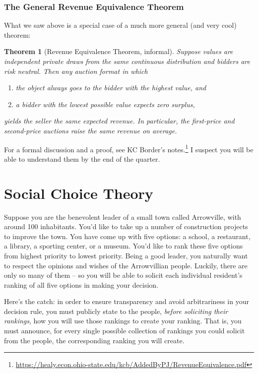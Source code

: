 \documentclass[12pt]{article}
\newtheorem{theorem}{Theorem}
\theoremstyle{definition}
\theoremstyle{remark}
\theoremstyle{plain}                          %
\begin{document}
\subsubsection{The General Revenue Equivalence Theorem}

What we saw above is a special case of a much more general (and very cool) theorem:

\begin{theorem}[Revenue Equivalence Theorem, informal]\label{thm:ret}
Suppose values are independent private draws from the same continuous
distribution and bidders are risk neutral. Then \emph{any} auction format in
which
\begin{enumerate}[label=(\roman*), nosep, topsep=3pt]
  \item the object always goes to the bidder with the highest value, and
  \item a bidder with the lowest possible value expects zero surplus,
\end{enumerate}
yields the seller the same expected revenue. In particular, the first-price and
second-price auctions raise the same revenue on average.
\end{theorem}

For a formal discussion and a proof, see KC Border's notes.\footnote{\url{https://healy.econ.ohio-state.edu/kcb/AddedByPJ/RevenueEquivalence.pdf}} I suspect you will be able to understand them by the end of the quarter.

\newpage

\section{Social Choice Theory}
 
Suppose you are the benevolent leader of a small town called Arrowville, with around 100 inhabitants. You'd like to take up a number of construction projects to improve the town. You have come up with five options: a school, a restaurant, a library, a sporting center, or a museum. You'd like to rank these five options from highest priority to lowest priority. Being a good leader, you naturally want to respect the opinions and wishes of the Arrowvillian people. Luckily, there are only so many of them -- so you will be able to solicit each individual resident's ranking of all five options in making your decision.
 
Here's the catch: in order to ensure transparency and avoid arbitrariness in your decision rule, you must publicly state to the people, \textit{before soliciting their rankings}, how you will use those rankings to create your ranking. That is, you must announce, for every single possible collection of rankings you could solicit from the people, the corresponding ranking you will create.
 
\end{document}
